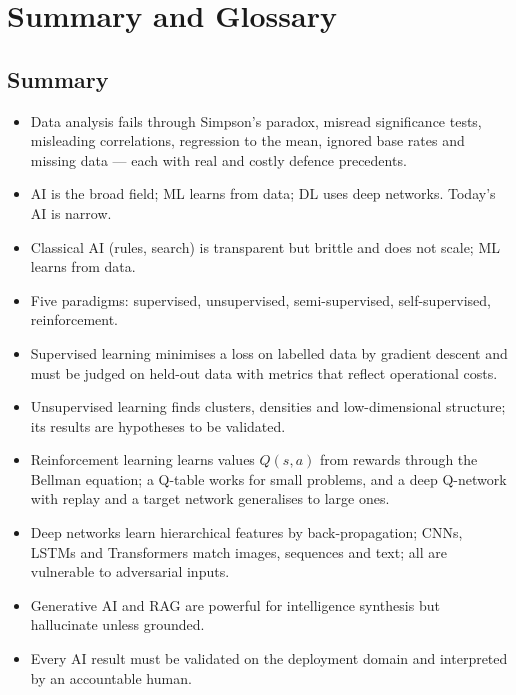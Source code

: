 \documentclass[11pt]{article}
\begin{document}
\section{Summary and Glossary}
\subsection{Summary}
\begin{itemize}
\item Data analysis fails through Simpson's paradox, misread significance tests, misleading correlations, regression to the mean, ignored base rates and missing data --- each with real and costly defence precedents.
\item AI is the broad field; ML learns from data; DL uses deep networks. Today's AI is narrow.
\item Classical AI (rules, search) is transparent but brittle and does not scale; ML learns from data.
\item Five paradigms: supervised, unsupervised, semi-supervised, self-supervised, reinforcement.
\item Supervised learning minimises a loss on labelled data by gradient descent and must be judged on held-out data with metrics that reflect operational costs.
\item Unsupervised learning finds clusters, densities and low-dimensional structure; its results are hypotheses to be validated.
\item Reinforcement learning learns values $Q(s,a)$ from rewards through the Bellman equation; a Q-table works for small problems, and a deep Q-network with replay and a target network generalises to large ones.
\item Deep networks learn hierarchical features by back-propagation; CNNs, LSTMs and Transformers match images, sequences and text; all are vulnerable to adversarial inputs.
\item Generative AI and RAG are powerful for intelligence synthesis but hallucinate unless grounded.
\item Every AI result must be validated on the deployment domain and interpreted by an accountable human.
\end{itemize}
\end{document}
